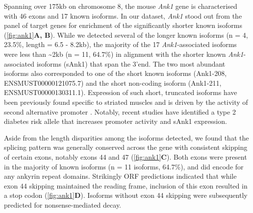 Spanning over 175kb on chromosome 8, the mouse \textit{Ank1} gene is characterised with 46 exons and 17 known isoforms. In our dataset, \textit{Ank1} stood out from the panel of target genes for enrichment of the significantly shorter known isoforms (\cref{fig:ank1}\textbf{A, B}). While we detected several of the longer known isoforms (n = 4, 23.5\%, length = 6.5 - 8.2kb), the majority of the 17 \textit{Ank1}-associated isoforms were less than \textasciitilde 2kb (n = 11, 64.7\%) in alignment with the shorter known \textit{Ank1}-associated isoforms (sAnk1) that span the 3'end. The two most abundant isoforms also corresponded to one of the short known isoforms (Ank1-208, ENSMUST00000121075.7) and the short non-coding isoform (Ank1-211, ENSMUST00000130311.1). Expression of such short, truncated isoforms have been previously found specific to striated muscles and is driven by the activity of second alternative promoter \cite{Gallagher1998}. Notably, recent studies have identified a type 2 diabetes risk allele that increases promoter activity and sAnk1 expression\cite{Yan2016}.  %

Aside from the length disparities among the isoforms detected, we found that the splicing pattern was generally conserved across the gene with consistent skipping of certain exons, notably exons 44 and 47 (\cref{fig:ank1}\textbf{C}). Both exons were present in the majority of known isoforms (n = 11 isoforms, 64.7\%), and did encode for any ankyrin repeat domains. Strikingly ORF predictions indicated that while exon 44 skipping maintained the reading frame, inclusion of this exon resulted in a stop codon (\cref{fig:ank1}\textbf{D}). Isoforms without exon 44 skipping were subsequently predicted for nonsense-mediated decay. 

